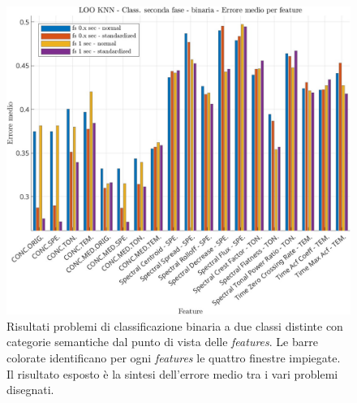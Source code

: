 \begin{center}	
	\begin{figure}[htp]
		\centering
		\includegraphics[width=1\textwidth]{img/cap4-classificazione_fase2_features_binaria_distinte.jpg}
		\caption{Risultati problemi di classificazione binaria a due classi distinte con categorie semantiche dal punto di
			vista delle \textit{features}. Le barre colorate identificano per ogni \textit{features} le quattro finestre impiegate. Il risultato
			esposto è la sintesi dell’errore medio tra i vari problemi disegnati.}
		\label{fig4.7}
	\end{figure}
\end{center}	
